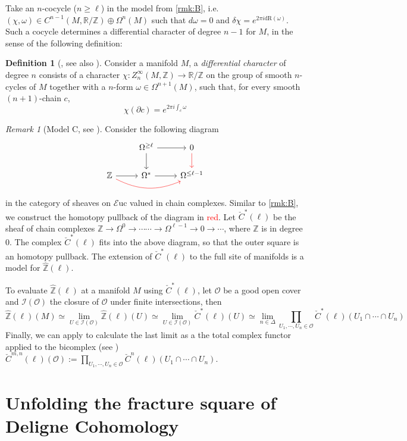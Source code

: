 \documentclass[10pt]{amsart}
\newcommand{\I}{\mathscr{I}}
\newcommand{\bR}{\mathbb{R}}
\newcommand{\bZ}{\mathbb{Z}}
\newcommand{\Euc}{\mathscr{E}\mathrm{uc}}
\newcommand{\dr}{\mathrm{dR}}
\theoremstyle{definition}
\newtheorem{definition}[equation]{Definition}
\theoremstyle{remark}
\newtheorem{remark}[equation]{Remark}
\numberwithin{equation}{section}
\begin{document}
Take an $n$-cocycle ($n\geq\ell$) in the model from \cref{rmk:B}, i.e. $(\chi,\omega)\in C^{n-1}(M,\bR/\bZ)\oplus\Omega^{n}(M)$ such that $d\omega=0$ and $\delta\chi=e^{2\pi i\dr(\omega)}$. Such a cocycle determines a differential character of degree $n-1$ for $M$, in the sense of the following definition:
\begin{definition}[{\cite[Definition 3.4]{hopkinssinger2005diffcoh}}, see also {\cite[Chapter 5]{barbecker2014diffchar}}] Consider a manifold $M$, a \emph{differential character} of degree $n$ consists of a character $\chi:Z^\infty_{n}(M,\bZ)\to\bR/\bZ$ on the group of smooth $n$-cycles of $M$ together with a $n$-form $\omega\in\Omega^{n+1}(M)$, such that, for every smooth $(n+1)$-chain $c$, \[\chi(\partial c)=e^{2\pi i\int_c\omega}\]
\end{definition}

\begin{remark}[Model C, see {\cite[Lemma 7.3.4]{amabeldebrayhaine2021diffcoh}}]\label{rmk:C} Consider the following diagram  
  \[\begin{tikzcd}
     & \Omega^{\geq \ell}\arrow[d] \arrow[r] & 0\arrow[d,color=red] \\
    \bZ \arrow[r]\arrow[rr,bend right=2.5em,color=red] & \Omega^*\arrow[r] & \Omega^{\leq\ell-1}
  \end{tikzcd}\] in the category of {sheaves} on $\Euc$ valued in chain complexes. Similar to \cref{rmk:B}, we construct the homotopy pullback of the diagram in \textcolor{red}{red}. Let $\check{C}^*(\ell)$ be the sheaf of chain complexes $\bZ\to\Omega^0\to\cdots\cdots\to\Omega^{\ell-1}\to0\to\cdots$, where $\bZ$ is in degree 0. The complex $\check{C}^*(\ell)$ fits into the above diagram, so that the outer square is an homotopy pullback. The extension of $\check{C}^*(\ell)$ to the full site of manifolds is a model for $\hat{\bZ}(\ell)$.

  To evaluate $\hat{\bZ}(\ell)$ at a manifold $M$ using $\check{C}^*(\ell)$, let $\mathscr{O}$ be a good open cover and $\I(\mathscr O)$ the closure of $\mathscr{O}$ under finite intersections, then
\[
    \hat{\bZ}(\ell)(M) \simeq\lim_{U\in\I(\mathscr{O})}\hat{\bZ}(\ell)(U)\simeq\lim_{U\in\I(\mathscr O)} \check{C}^*(\ell)(U)\simeq\lim_{n\in\Delta}\prod_{U_1,\cdots,U_n\in\mathscr{O}}\check{C}^*(\ell)(U_1\cap\cdots\cap U_n) 
  \]
  Finally, we can apply \cite[Lemma 7.10]{bunkenikolausvoelkl2016diffcoh} to calculate the last limit as a the total complex functor applied to the bicomplex (see \cite{project2025cech}) $\check{C}^{m,n}(\ell)(\mathscr{O}):=\prod_{U_1,\cdots,U_n\in\mathscr{O}}\check{C}^n(\ell)(U_1\cap\cdots\cap U_n)$.
\end{remark}


\section{Unfolding the fracture square of Deligne Cohomology}

{\footnotesize


}
\end{document}
